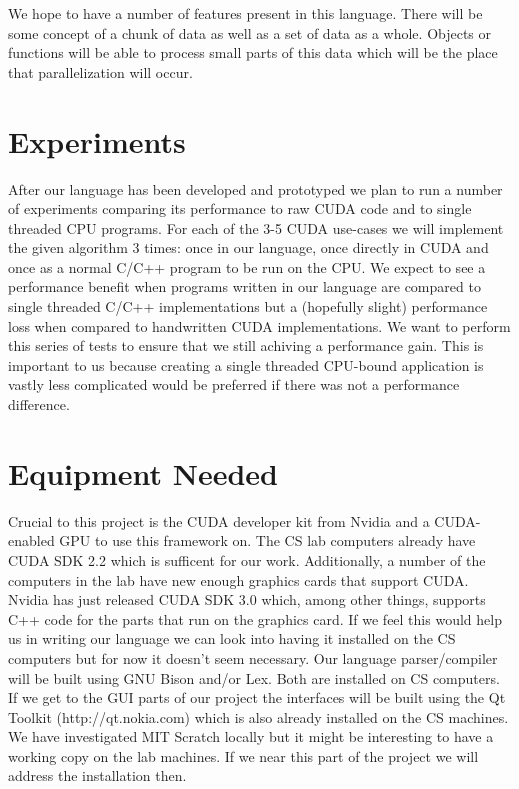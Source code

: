\documentclass{article}
\begin{document}
We hope to have a number of features present in this language. There will be some concept of a chunk of data as well as a set of data as a whole. Objects or functions will be able to process small parts of this data which will be the place that parallelization will occur. 


\section{Experiments}
After our language has been developed and prototyped we plan to run a number of experiments comparing its performance to raw CUDA code and to single threaded CPU programs. For each of the 3-5 CUDA use-cases we will implement the given algorithm 3 times: once in our language, once directly in CUDA and once as a normal C/C++ program to be run on the CPU. We expect to see a performance benefit when programs written in our language are compared to single threaded C/C++ implementations but a (hopefully slight) performance loss when compared to handwritten CUDA implementations. We want to perform this series of tests to ensure that we still achiving a performance gain. This is important to us because creating a single threaded CPU-bound application is vastly less complicated would be preferred if there was not a performance difference.

\section{Equipment Needed}
Crucial to this project is the CUDA developer kit from Nvidia and a CUDA-enabled GPU to use this framework on. The CS lab computers already have CUDA SDK 2.2 which is sufficent for our work. Additionally, a number of the computers in the lab have new enough graphics cards that support CUDA. Nvidia has just released CUDA SDK 3.0 which, among other things, supports C++ code for the parts that run on the graphics card. If we feel this would help us in writing our language we can look into having it installed on the CS computers but for now it doesn't seem necessary. Our language parser/compiler will be built using GNU Bison and/or Lex. Both are installed on CS computers. If we get to the GUI parts of our project the interfaces will be built using the Qt Toolkit (http://qt.nokia.com) which is also already installed on the CS machines. We have investigated MIT Scratch locally but it might be interesting to have a working copy on the lab machines. If we near this part of the project we will address the installation then.
\end{document}
